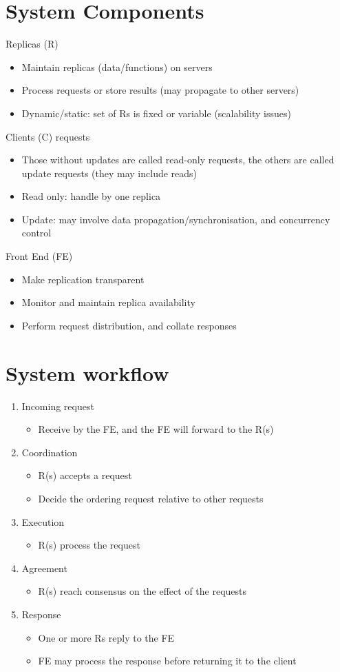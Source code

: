 \documentclass{article}[18pt]
\begin{document}
\section{System Components}
Replicas (R)
\begin{itemize}
	\item Maintain replicas (data/functions) on servers
	\item Process requests or store results (may propagate to other servers)
	\item Dynamic/static: set of Rs is fixed or variable (scalability issues)
\end{itemize}
Clients (C) requests
\begin{itemize}
	\item Those without updates are called read-only requests, the others are called update requests (they may include reads)
	\item Read only: handle by one replica
	\item Update: may involve data propagation/synchronisation, and concurrency control
\end{itemize}
Front End (FE)
\begin{itemize}
	\item Make replication transparent
	\item Monitor and maintain replica availability
	\item Perform request distribution, and collate responses
\end{itemize}
\section{System workflow}
\begin{enumerate}
	\item Incoming request
	\begin{itemize}
		\item Receive by the FE, and the FE will forward to the R(s)
	\end{itemize}
	\item Coordination
	\begin{itemize}
		\item R(s) accepts a request
		\item Decide the ordering request relative to other requests
	\end{itemize}
	\item Execution
	\begin{itemize}
		\item R(s) process the request
	\end{itemize}
	\item Agreement
	\begin{itemize}
		\item R(s) reach consensus on the effect of the requests
	\end{itemize}
	\item Response
	\begin{itemize}
		\item One or more Rs reply to the FE
		\item FE may process the response before returning it to the client
	\end{itemize}
\end{enumerate}
\end{document}
